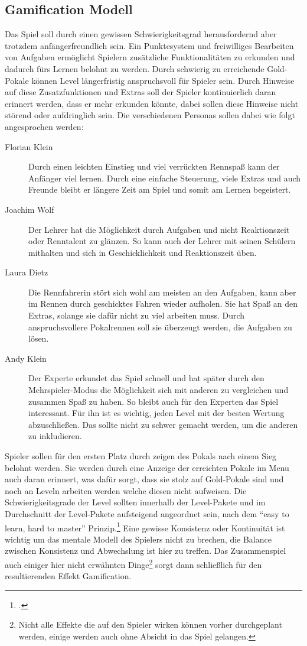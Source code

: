 \subsection{Gamification Modell}\label{ssec:gamification-modell}
	Das Spiel soll durch einen gewissen Schwierigkeitsgrad herausfordernd aber trotzdem anfängerfreundlich sein. Ein Punktesystem und freiwilliges Bearbeiten von Aufgaben ermöglicht Spielern zusätzliche Funktionalitäten zu erkunden und dadurch fürs Lernen belohnt zu werden. Durch schwierig zu erreichende Gold-Pokale können Level längerfristig anspruchsvoll für Spieler sein.
	Durch Hinweise auf diese Zusatzfunktionen und Extras soll der Spieler kontinuierlich daran erinnert werden, dass er mehr erkunden könnte, dabei sollen diese Hinweise nicht störend oder aufdringlich sein.
	Die verschiedenen Personas sollen dabei wie folgt angesprochen werden:
	\begin{description}
		\item[Florian Klein]{
			Durch einen leichten Einstieg und viel verrückten Rennspaß kann der Anfänger viel lernen. Durch eine einfache Steuerung, viele Extras und auch Freunde bleibt er längere Zeit am Spiel und somit am Lernen begeistert.
		}
		\item[Joachim Wolf]{
			Der Lehrer hat die Möglichkeit durch Aufgaben und nicht Reaktionszeit oder Renntalent zu glänzen. So kann auch der Lehrer mit seinen Schülern mithalten und sich in Geschicklichkeit und Reaktionszeit üben.
		}
		\item[Laura Dietz]{
			Die Rennfahrerin stört sich wohl am meisten an den Aufgaben, kann aber im Rennen durch geschicktes Fahren wieder aufholen. Sie hat Spaß an den Extras, solange sie dafür nicht zu viel arbeiten muss.
			Durch anspruchsvollere Pokalrennen soll sie überzeugt werden, die Aufgaben zu lösen.
		}
		\item[Andy Klein]{
			Der Experte erkundet das Spiel schnell und hat später durch den Mehrspieler-Modus die Möglichkeit sich mit anderen zu vergleichen und zusammen Spaß zu haben. So bleibt auch für den Experten das Spiel interessant.
			Für ihn ist es wichtig, jeden Level mit der besten Wertung abzuschließen. Das sollte nicht zu schwer gemacht werden, um die anderen zu inkludieren.
		}
	\end{description}
	Spieler sollen für den ersten Platz durch zeigen des Pokals nach einem Sieg belohnt werden. Sie werden durch eine Anzeige der erreichten Pokale im Menu auch daran erinnert, was dafür sorgt, dass sie stolz auf Gold-Pokale sind und noch an Leveln arbeiten werden welche diesen nicht aufweisen.
	Die Schwierigkeitsgrade der Level sollten innerhalb der Level-Pakete und im Durchschnitt der Level-Pakete aufsteigend angeordnet sein, nach dem \enquote{easy to learn, hard to master} Prinzip.\footcite[Bushnell's Law]{easy-to-learn-hard-to-master} Eine gewisse Konsistenz oder Kontinuität ist wichtig um das mentale Modell des Spielers nicht zu brechen, die Balance zwischen Konsistenz und Abwechslung ist hier zu treffen.
	Das Zusammenspiel auch einiger hier nicht erwähnten Dinge\footnote{Nicht alle Effekte die auf den Spieler wirken können vorher durchgeplant werden, einige werden auch ohne Absicht in das Spiel gelangen.} sorgt dann schließlich für den resultierenden Effekt Gamification.


